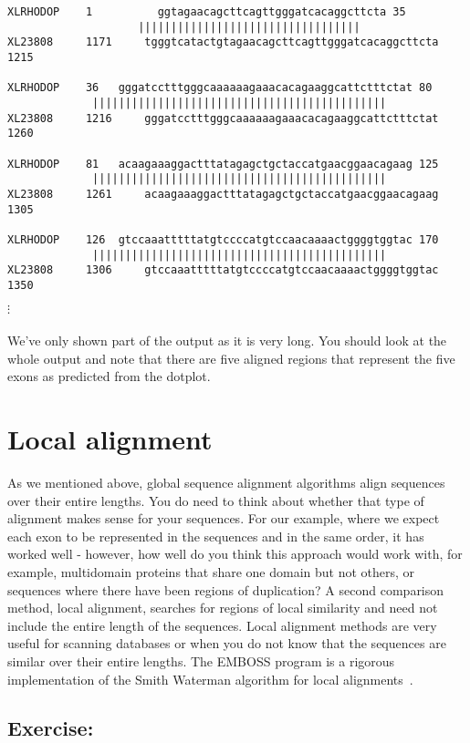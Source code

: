 \documentclass[12pt]{report}
\begin{document}
\begin{verbatim}
XLRHODOP	1		   ggtagaacagcttcagttgggatcacaggcttcta 35
				    ||||||||||||||||||||||||||||||||||
XL23808		1171	 tgggtcatactgtagaacagcttcagttgggatcacaggcttcta 1215

XLRHODOP	36	 gggatcctttgggcaaaaaagaaacacagaaggcattctttctat 80
			 |||||||||||||||||||||||||||||||||||||||||||||
XL23808		1216	 gggatcctttgggcaaaaaagaaacacagaaggcattctttctat 1260

XLRHODOP	81	 acaagaaaggactttatagagctgctaccatgaacggaacagaag 125
			 |||||||||||||||||||||||||||||||||||||||||||||
XL23808		1261	 acaagaaaggactttatagagctgctaccatgaacggaacagaag 1305

XLRHODOP	126	 gtccaaatttttatgtccccatgtccaacaaaactggggtggtac 170
			 |||||||||||||||||||||||||||||||||||||||||||||
XL23808		1306	 gtccaaatttttatgtccccatgtccaacaaaactggggtggtac 1350   
\end{verbatim}
$\vdots$
\\
\\
\noindent We've	only shown part	of the output as it is very long. You should
look at	the whole output and note that there are five aligned regions
that represent the five	exons as predicted from	the dotplot.

\section{Local alignment}
As we mentioned	above, global sequence alignment algorithms align
sequences over their entire lengths. You do need to think about
whether	that type of alignment makes sense for your sequences. For our
example, where we expect each exon to be represented in	the sequences
and in the same	order, it has worked well - however, how well do you
think this approach would work with, for example, multidomain proteins
that share one domain but not others, or sequences where there have
been regions of	duplication? A second comparison method, local
alignment, searches for	regions	of local similarity and	need not
include	the entire length of the sequences. Local alignment methods
are very useful	for scanning databases or when you do not know that
the sequences are similar over their entire lengths. The EMBOSS
program	 is a rigorous implementation of the Smith	Waterman
algorithm for local alignments~\cite{Smith:81}.

\subsection*{Exercise: }
\end{document}

